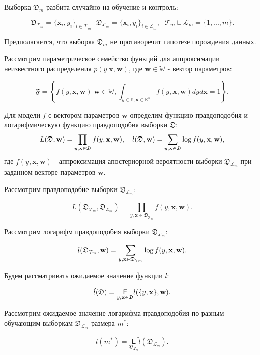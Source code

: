 \documentclass[12pt,twoside]{article}
\begin{document}
Выборка $\mathfrak D_m$ разбита случайно на обучение и контроль:

$$
\mathfrak D_{\mathcal T_m} = \{\textbf{x}_i, y_i\}_{i \in \mathcal T_m} ~~~ \mathfrak D_{\mathcal L_m} = \{\textbf{x}_i, y_i\}_{i \in \mathcal L_m}, ~~~ \mathcal T_m \sqcup \mathcal L_m = \{1, ..., m\}. 
$$

Предполагается, что выборка $\mathfrak D_m$ не противоречит гипотезе порождения данных.

Рассмотрим параметрическое семейство функций для аппроксимации неизвестного распределения $p(y | \textbf{x}, \textbf{w})$, где $\textbf{w} \in \mathbb{W}$ - вектор параметров:

$$
\mathfrak{F} = \left\{f(y, \textbf{x}, \textbf{w}) | \textbf{w} \in \mathbb{W}, \int_{y \in \mathbb{Y}, \textbf{x} \in \mathbb{R}^n} f(y, \textbf{x}, \textbf{w})dyd\textbf{x} = 1\right\}.
$$

Для модели $f$ с вектором параметров $\textbf{w}$ определим функцию правдоподобия и логарифмическую функцию правдоподобия выборки $\mathfrak D$:
$$
L(\mathfrak{D}, \textbf{w}) = \prod_{y, \textbf{x} \in \mathfrak D} f(y, \textbf{x}, \textbf{w}),~~~ l(\mathfrak D, \textbf w) = \sum_{y, \textbf{x} \in \mathfrak D}\log f(y, \textbf{x}, \textbf{w}),
$$
где $f(y, \textbf{x}, \textbf{w})$ - аппроксимация апостериорной вероятности выборки $\mathfrak D_{\mathcal L_m}$ при заданном векторе параметров $\textbf{w}$.

Рассмотрим правдоподобие выборки $\mathfrak D_{\mathcal L_m}$:

$$
L(\mathfrak D_{\mathcal T_m}, \mathfrak D_{\mathcal L_m}) = \prod_{y, \textbf{x} \in \mathfrak D_{\mathcal T_m}} f(y, \textbf{x},  \textbf{w}).
$$

Рассмотрим логарифм правдоподобия выборки $\mathfrak D_{\mathcal L_m}$:

$$
l(\mathfrak D_{\mathcal T_m}, \textbf w) = \sum_{y, \textbf{x} \in \mathfrak D_{\mathcal T_m}}\log f(y, \textbf{x}, \textbf{w}).
$$

Будем рассматривать ожидаемое значение функции $l$:

$$
\tilde{l}(\mathfrak D)  = \underset{y, \textbf{x} \in \mathfrak D}{\mathsf E} l(\{y, \textbf{x}\}, \textbf w).
$$

Рассмотрим ожидаемое значение логарифма правдоподобия по разным обучающим выборкам $\mathfrak D_{\mathcal L_m}$ размера $m^*$:

$$
l(m^*) = \underset{\mathfrak D_{\mathcal L_m}}{\mathsf E} \tilde{l}(\mathfrak D_{\mathcal L_m}).
$$
\end{document}
